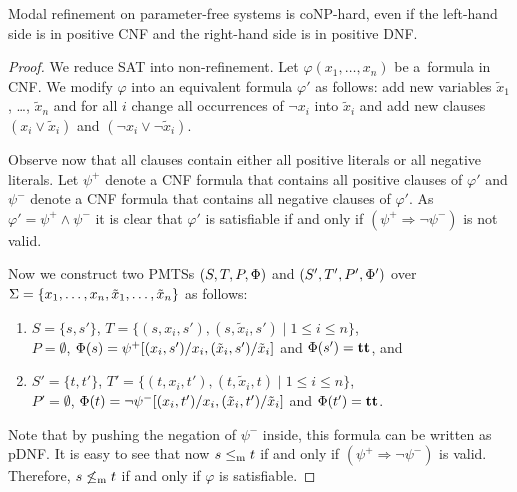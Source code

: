 \begin{proposition}
Modal refinement on parameter-free systems is coNP-hard, 
even if the left-hand side is in positive CNF
and the right-hand side is in positive DNF.
\end{proposition}
\begin{proof}
We reduce SAT into non-refinement.
Let $\varphi(x_1, \ldots, x_n)$ be a~formula in CNF.
We modify $\varphi$ into an equivalent formula $\varphi'$ as follows:
add new variables $\tilde x_1$, \ldots, $\tilde x_n$
and for all $i$ change all occurrences of $\neg x_i$ into $\tilde x_i$
and add new clauses
$(x_i \vee \tilde x_i)$ and $(\neg x_i \vee \neg \tilde x_i)$.

Observe now that all clauses contain either all positive literals 
or all negative literals. 
Let $\psi^+$ denote a CNF formula that contains all positive clauses
of $\varphi'$ and $\psi^-$ denote a CNF formula that contains all 
negative clauses of $\varphi'$.
As $\varphi' = \psi^+ \wedge \psi^-$ it is clear that 
$\varphi'$ is satisfiable if and only if
$(\psi^+ \Rightarrow \neg \psi^-)$ is not valid.

Now we construct two 
PMTSs $(S,T,P,\mathrm{\Phi})$ and $(S',T',P',\mathrm{\Phi}')$ 
over \linebreak $\mathrm{\Sigma} = \{ x_1, \ldots, x_n, \tilde x_1, \ldots, \tilde x_n \}$
 as follows: 
\begin{enumerate}
    \item  $S=\{s,s'\}$, 
    $T= \{(s,x_i,s'), (s,\tilde x_i, s') \mid 1 \leq i \leq n\}$, \\
    $P = \emptyset$,
    $\mathrm{\Phi}(s) = \psi^+[(x_i,s')/x_i,(\tilde x_i,s')/\tilde x_i]$ 
    and $\mathrm{\Phi}(s') = \mathbf{tt}$, and
    \item $S' = \{t,t'\}$, 
    $T' = \{ (t,x_i,t'),(t,\tilde x_i,t) \mid 1 \leq i \leq n\}$, \\
    $P' = \emptyset$, 
    $\mathrm{\Phi}(t) = \neg \psi^-[(x_i,t')/x_i,(\tilde x_i,t')/\tilde x_i]$ and 
$\mathrm{\Phi}(t') = \mathbf{tt}$.
\end{enumerate}
 Note that by pushing the negation of $\psi^-$ inside, 
 this formula can be written as pDNF.
It is easy to see that now $s \le_\mathrm m t$ if and only if 
$(\psi^+ \Rightarrow \neg \psi^-)$ is valid.
Therefore, $s \not\le_\mathrm m t$ if and only 
if $\varphi$ is satisfiable.

\end{proof}














